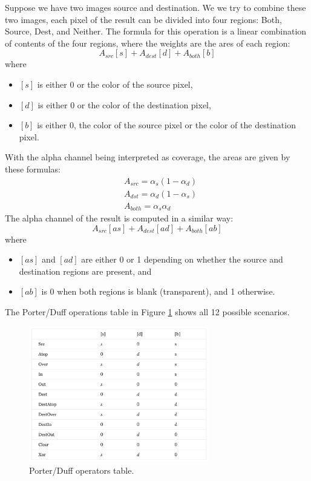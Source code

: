 \documentclass[11pt]{article}
\begin{document}
Suppose we have two images source and destination. We we try to combine these two images, each pixel of the result can be divided into four regions: Both, Source, Dest, and Neither. The formula for this operation is a linear combination of contents of the four regions, where the weights are the ares of each region: 
\begin{equation}
	A_{src}[s] + A_{dest}[d] + A_{both}[b] 
\end{equation}
where
\begin{itemize}
	\item $[s]$ is either 0 or the color of the source pixel, 
	\item $[d]$ is either 0 or the color of the destination pixel, 
	\item $[b]$ is either 0, the color of the source pixel or the color of the destination pixel.
\end{itemize}
With the alpha channel being interpreted as coverage, the areas are given by these formulas: 
\begin{align}
	&A_{src} = \alpha_s (1 - \alpha_d) \\
	&A_{dst} = \alpha_d (1 - \alpha_s) \\
	&A_{both} = \alpha_s \alpha_d
\end{align}
The alpha channel of the result is computed in a similar way: 
\begin{equation}
	A_{src} [as] + A_{dest} [ad] + A_{both} [ab]
\end{equation}
where 
\begin{itemize}
	\item $[as]$ and $[ad]$ are either 0 or 1 depending on whether the source and destination regions are present, and 
	\item $[ab]$ is 0 when both regions is blank (transparent), and 1 otherwise. 
\end{itemize}
The Porter/Duff operations table in Figure \ref{porter duff} shows all 12 possible scenarios. 
\begin{figure}
	\center\includegraphics[width=0.7\textwidth]{figs/porter duff}
	\caption{\label{porter duff} Porter/Duff operators table. }
\end{figure}
\end{document}
